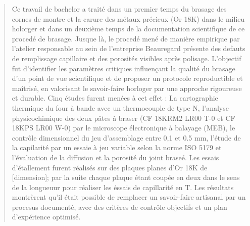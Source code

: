 \begin{abstract}

    
    Ce travail de bachelor a traité dans un premier temps du brasage des cornes de montre et la carure
    des métaux précieux (Or 18K) dans le milieu holorger et dans un deuxième temps de la documentation
    scientifique de ce procedé de brasage. Jusque là, le procedé mené de manière empirique par l'atelier
    responsable au sein de l'entreprise Beauregard présente des defauts de remplissage capillaire et des
    porosités visibles après polisage. L'objectif fut d'identifier les paramètres critiques influençant
    la qualité du brasage d'un point de vue scientifique et de proposer un protocole reproductible et
    maîtrisé, en valorisant le savoir-faire horloger par une approche rigoureuse et durable. Cinq études
    furent menées à cet effet : La cartographie thermique du four à bande avec un thermocouple de type N,
    l'analyse physicochimique des deux pâtes à braser (CF 18KRM2 LR00 T-0 et CF 18KPS LR00 W-0) par le
    microscope électronique à balayage (MEB), le contrôle dimensionnel du jeu d'assemblage entre 0,1 et 0.5 mm,
    l'étude de la capilarité par un essaie à jeu variable selon la norme ISO 5179 et l'évaluation de
    la diffusion et la porosité du joint braseé. Les essais d'étallement furent réalisés sur des plaques
    planes d'Or 18K de [dimension]; par la suite chaque plaque étant coupée en deux dans le sens de la longueuur pour réaliser les éssais de
    capillarité en T. Les résultats montrèrent qu'il était possible de remplacer un savoir-faire artisanal
    par un procesus documenté, avec des critères de contrôle objectifs et un plan d'expérience optimisé.
    

\end{abstract}
